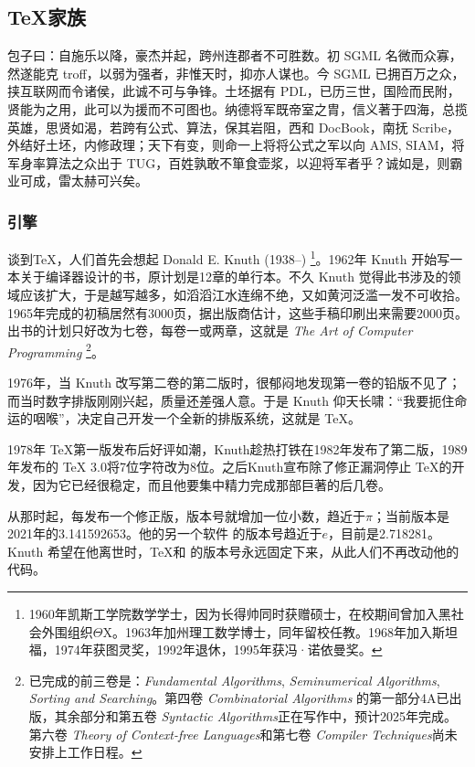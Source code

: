 \subsection{\TeX 家族}
\label{sec:tex}

包子曰：自施乐以降，豪杰并起，跨州连郡者不可胜数。初 SGML 名微而众寡，然遂能克 troff，以弱为强者，非惟天时，抑亦人谋也。今 SGML 已拥百万之众，挟互联网而令诸侯，此诚不可与争锋。土坯据有 PDL，已历三世，国险而民附，贤能为之用，此可以为援而不可图也。纳德将军既帝室之胄，信义著于四海，总揽英雄，思贤如渴，若跨有公式、算法，保其岩阻，西和 DocBook，南抚 Scribe，外结好土坯，内修政理；天下有变，则命一上将将公式之军以向 AMS, SIAM，将军身率算法之众出于 TUG，百姓孰敢不箪食壶浆，以迎将军者乎？诚如是，则霸业可成，雷太赫可兴矣。

\subsubsection{引擎}

谈到\TeX{}，人们首先会想起 Donald E. Knuth (1938--)\indexKnuth{} \footnote{1960年凯斯工学院数学学士，因为长得帅同时获赠硕士，在校期间曾加入黑社会外围组织$\Theta\mathrm{X}$。1963年加州理工数学博士，同年留校任教。1968年加入斯坦福\indexStanford{}，1974年获图灵奖，1992年退休，1995年获冯·诺依曼奖。}。1962年 Knuth 开始写一本关于编译器设计的书，原计划是12章的单行本。不久 Knuth 觉得此书涉及的领域应该扩大，于是越写越多，如滔滔江水连绵不绝，又如黄河泛滥一发不可收拾。1965年完成的初稿居然有3000页，据出版商估计，这些手稿印刷出来需要2000页。出书的计划只好改为七卷，每卷一或两章，这就是 \emph{The Art of Computer Programming} \footnote{已完成的前三卷是：\emph{Fundamental Algorithms}, \emph{Seminumerical Algorithms}, \emph{Sorting and Searching}。第四卷 \emph{Combinatorial Algorithms} 的第一部分4A已出版，其余部分和第五卷 \emph{Syntactic Algorithms}正在写作中，预计2025年完成。第六卷 \emph{Theory of Context-free Languages}和第七卷 \emph{Compiler Techniques}尚未安排上工作日程。}。

1976年，当 Knuth 改写第二卷的第二版时，很郁闷地发现第一卷的铅版不见了；而当时数字排版刚刚兴起，质量还差强人意。于是 Knuth 仰天长啸：“我要扼住命运的咽喉”，决定自己开发一个全新的排版系统，这就是 \TeX。

1978年 \TeX 第一版发布后好评如潮，Knuth趁热打铁在1982年发布了第二版，1989年发布的 \TeX{} 3.0将7位字符改为8位。之后Knuth宣布除了修正漏洞停止 \TeX 的开发，因为它已经很稳定，而且他要集中精力完成那部巨著的后几卷。

从那时起，每发布一个修正版，版本号就增加一位小数，趋近于$\pi$；当前版本是2021年的3.141592653。他的另一个软件 \MF 的版本号趋近于$e$，目前是2.718281。Knuth 希望在他离世时，\TeX 和 \MF 的版本号永远固定下来，从此人们不再改动他的代码。

